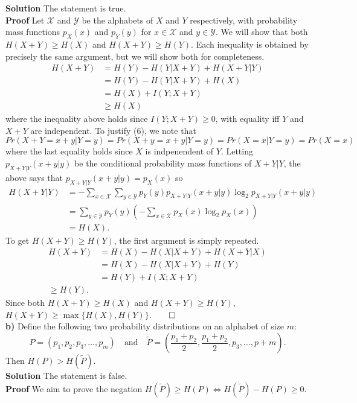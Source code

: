 \documentclass[11pt, letterpaper]{article}
\newcommand{\mc}[1]{\mathcal{#1}}
\begin{document}
{\bf Solution} The statement is true.\\[10pt]
{\bf Proof} Let $\mc{X}$ and $\mc{Y}$ be the alphabets of $X$ and $Y$ respectively, with probability mass functions $p_X(x)$ and $p_Y(y)$ for $x\in\mc{X}$ and $y\in\mc{Y}$.
We will show that both $H(X+Y)\geq H(X)$ and $H(X+Y)\geq H(Y)$. Each inequality is obtained by precisely the same argument, but we will show both
for completeness.
\begin{align*}
    H(X+Y)&=H(Y)-H(Y|X+Y)+H(X+Y|Y)\\
    &=H(Y)-H(Y|X+Y)+H(X)\tag{6}\\
    &=H(X)+I(Y;X+Y)\\
    &\geq H(X)
\end{align*}
where the inequality above holds since $I(Y;X+Y)\geq 0$, with equality iff $Y$ and $X+Y$ are independent. To justify (6), we note that
\[Pr(X+Y=x+y|Y=y)=Pr(X+y=x+y|Y=y)=Pr(X=x|Y=y)=Pr(X=x)\]
where the last equality holds since $X$ is indpenendent of $Y$. Letting $p_{X+Y|Y}(x+y|y)$ be the conditional probability mass functions of $X+Y|Y$,
the above says that $p_{X+Y|Y}(x+y|y)=p_X(x)$ so
\begin{align*}
    H(X+Y|Y)&=-\sum_{x\in\mc{X}}\sum_{y\in\mc{Y}}p_Y(y)p_{X+Y|Y}(x+y|y)\log_2p_{X+Y|Y}(x+y|y)\\
    &=\sum_{y\in\mc{Y}}p_Y(y)\left(-\sum_{x\in\mc{X}}p_X(x)\log_2p_X(x)\right)\\
    &=H(X).
\end{align*}
To get $H(X+Y)\geq H(Y)$, the first argument is simply repeated.
\begin{align*}
    H(X+Y)&=H(X)-H(X|X+Y)+H(X+Y|X)\\
    &=H(X)-H(X|X+Y)+H(Y)\\
    &=H(Y)+I(X;X+Y)\\
    \geq H(Y).
\end{align*}
Since both $H(X+Y)\geq H(X)$ and $H(X+Y)\geq H(Y)$, $H(X+Y)\geq\max\{H(X),H(Y)\}$.\hfill{$\qed$}\\[10pt]
{\bf b)} Define the following two probability distributions on an alphabet of size $m$:
\[P=(p_1,p_2,p_3,\dots,p_m)\quad\text{and}\quad \tilde{P}=\left(\frac{p_1+p_2}{2},\frac{p_1+p_2}{2},p_3,\dots,p+m\right).\]
Then $H(P)>H(\tilde{P})$.\\[10pt]
{\bf Solution} The statement is false.\\[10pt]
{\bf Proof} We aim to prove the negation $H(\tilde{P})\geq H(P)\Leftrightarrow H(\tilde{P})-H(P)\geq 0$.
\end{document}
